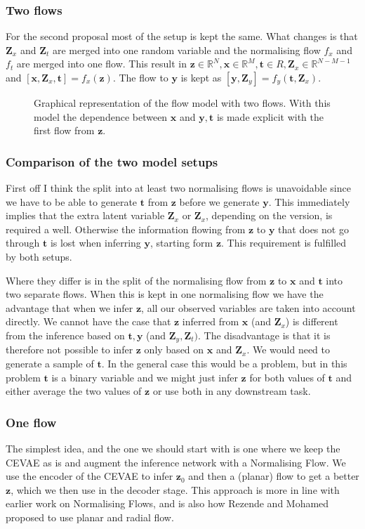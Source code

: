 \documentclass{article}
\newcommand{\R}{\mathbb{R}}
\newcommand{\bt}{\mathbf{t}}
\newcommand{\bx}{\mathbf{x}}
\newcommand{\by}{\mathbf{y}}
\newcommand{\bZ}{\mathbf{Z}}
\newcommand{\bz}{\mathbf{z}}
\begin{document}
\subsubsection{Two flows}
For the second proposal most of the setup is kept the same. What changes is that $\bZ_x$ and $\bZ_t$ are merged into one random variable and the normalising flow $f_x$ and $f_t$ are merged into one flow. This result in $\bz \in \R^N, \bx \in \R^M, \bt \in R, \bZ_x \in \R^{N-M-1}$ and $[\bx, \bZ_x, \bt] = f_x(\bz)$. The flow to $\by$ is kept as $[\by, \bZ_y] = f_y(\bt, \bZ_x)$. 

\begin{figure}
    \centering
    
    \caption{Graphical representation of the flow model with two flows. With this model the dependence between $\bx$ and $\by, \bt$ is made explicit with the first flow from $\bz$.}
    \label{fig:flow_graph_three_flows}
\end{figure}

\subsubsection{Comparison of the two model setups}
First off I think the split into at least two normalising flows is unavoidable since we have to be able to generate $\bt$ from $\bz$ before we generate $\by$. This  immediately implies that the extra latent variable $\bZ_x$ or $\bZ_x$, depending on the version, is required a well. Otherwise the information flowing from $\bz$ to $\by$ that does not go through $\bt$ is lost when inferring $\by$, starting form $\bz$. This requirement is fulfilled by both setups. 

Where they differ is in the split of the normalising flow from $\bz$ to $\bx$ and $\bt$ into two separate flows. When this is kept in one normalising flow we have the advantage that when we infer $\bz$, all our observed variables are taken into account directly. We cannot have the case that $\bz$ inferred from $\bx$ (and $\bZ_x$) is different from the inference based on $\bt, \by$ (and $\bZ_y, \bZ_t)$. The disadvantage is that it is therefore not possible to infer $\bz$ only based on $\bx$ and $\bZ_x$. We would need to generate a sample of $\bt$. In the general case this would be a problem, but in this problem $\bt$ is a binary variable and we might just infer $\bz$ for both values of $\bt$ and either average the two values of $\bz$ or use both in any downstream task.


\subsubsection{One flow}
The simplest idea, and the one we should start with is one where we keep the CEVAE as is and augment the inference network with a Normalising Flow. We use the encoder of the CEVAE to infer $\bz_0$ and then a (planar) flow to get a better $\bz$, which we then use in the decoder stage. This approach is more in line with earlier work on Normalising Flows, and is also how Rezende and Mohamed \cite{rezende2016variational} proposed to use planar and radial flow.
\end{document}
